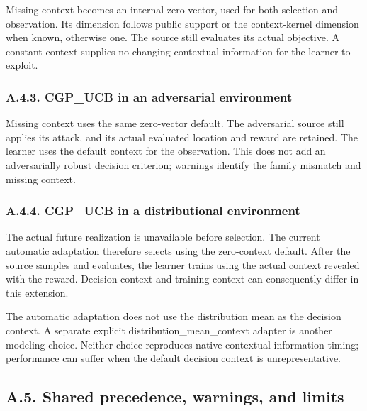 \documentclass[10pt,a4paper]{article}
\begin{document}
Missing context becomes an internal zero vector,\allowbreak{} used for both selection and observation. Its dimension follows public support or the context-kernel dimension when known,\allowbreak{} otherwise one. The source still evaluates its actual objective. A constant context supplies no changing contextual information for the learner to exploit.


\subsubsection*{A.4.3. CGP\_\allowbreak{}UCB in an adversarial environment}

Missing context uses the same zero-vector default. The adversarial source still applies its attack,\allowbreak{} and its actual evaluated location and reward are retained. The learner uses the default context for the observation. This does not add an adversarially robust decision criterion; warnings identify the family mismatch and missing context.


\subsubsection*{A.4.4. CGP\_\allowbreak{}UCB in a distributional environment}

The actual future realization is unavailable before selection. The current automatic adaptation therefore selects using the zero-context default. After the source samples and evaluates,\allowbreak{} the learner trains using the actual context revealed with the reward. Decision context and training context can consequently differ in this extension.


The automatic adaptation does not use the distribution mean as the decision context. A separate explicit distribution\_\allowbreak{}mean\_\allowbreak{}context adapter is another modeling choice. Neither choice reproduces native contextual information timing; performance can suffer when the default decision context is unrepresentative.


\subsection*{A.5. Shared precedence,\allowbreak{} warnings,\allowbreak{} and limits}
\end{document}
